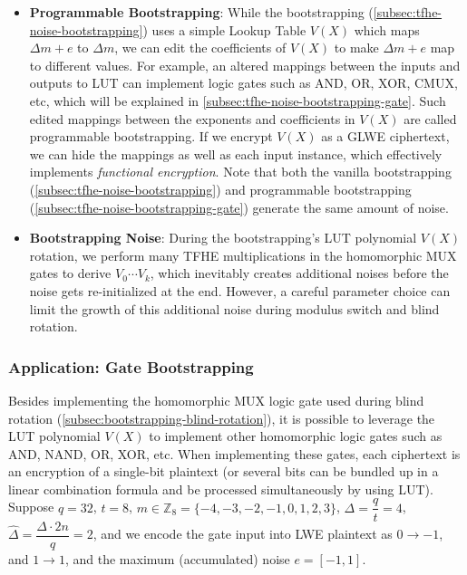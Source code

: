 \begin{itemize}
\item \textbf{Programmable Bootstrapping}: While the bootstrapping (\autoref{subsec:tfhe-noise-bootstrapping}) uses a simple Lookup Table $V(X)$ which maps $\Delta m + e$ to $\Delta m$, we can edit the coefficients of $V(X)$ to make $\Delta m + e$ map to different values. For example, an altered mappings between the inputs and outputs to LUT can implement logic gates such as AND, OR, XOR, CMUX, etc, which will be explained in \autoref{subsec:tfhe-noise-bootstrapping-gate}. Such edited mappings between the exponents and coefficients in $V(X)$ are called programmable bootstrapping. If we encrypt $V(X)$ as a GLWE ciphertext, we can hide the mappings as well as each input instance, which effectively implements \textit{functional encryption}. Note that both the vanilla bootstrapping (\autoref{subsec:tfhe-noise-bootstrapping}) and programmable bootstrapping (\autoref{subsec:tfhe-noise-bootstrapping-gate}) generate the same amount of noise. 
\item \textbf{Bootstrapping Noise}: During the bootstrapping's LUT polynomial $V(X)$ rotation, we perform many TFHE multiplications in the homomorphic MUX gates to derive $V_0 \cdots V_k$, which inevitably creates additional noises before the noise gets re-initialized at the end. However, a careful parameter choice can limit the growth of this additional noise during modulus switch and blind rotation. 
\end{itemize}


\subsubsection{Application: Gate Bootstrapping}
\label{subsec:tfhe-noise-bootstrapping-gate}

Besides implementing the homomorphic MUX logic gate used during blind rotation (\autoref{subsec:bootstrapping-blind-rotation}), it is possible to leverage the LUT polynomial $V(X)$ to implement other homomorphic logic gates such as AND, NAND, OR, XOR, etc. When implementing these gates, each ciphertext is an encryption of a single-bit plaintext (or several bits can be bundled up in a linear combination formula and be processed simultaneously by using LUT). Suppose $q = 32$, $t = 8$, $m \in \mathbb{Z}_8 = \{-4,-3, -2,-1,0,1,2,3\}$, $\Delta = \dfrac{q}{t} = 4$, $\hat\Delta = \dfrac{\Delta\cdot 2n}{q} = 2$, and we encode the gate input into LWE plaintext as $0 \rightarrow -1$, and $1 \rightarrow 1$, and the maximum (accumulated) noise $e = [-1, 1]$. 


